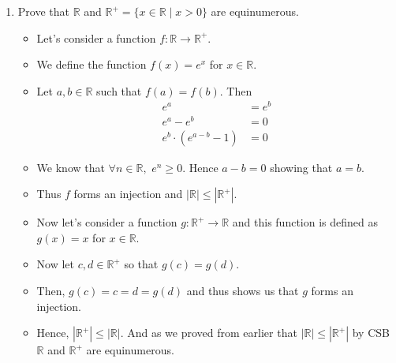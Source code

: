 \documentclass[letterpaper,12pt]{article}
\begin{document}
\begin{enumerate}
\item Prove that $\mathbb{R}$ and $\mathbb{R}^{+} = \{x \in \mathbb{R} \mid x>0\}$ are equinumerous.
\begin{itemize}
\item Let's consider a function $f:\mathbb{R} \rightarrow \mathbb{R}^{+}$.
\item We define the function $f(x) = e^x$ for $x\in \mathbb{R}$.
\item Let $a,b \in \mathbb{R}$ such that $f(a)=f(b).$ Then 
\begin{align}
e^a &= e^b \\ e^a-e^b &=0 \\ e^b \cdot (e^{a-b} -1) &=0	
\end{align}
\item We know that $\forall n\in \mathbb{R},$ $e^n \geq 0.$ Hence $a-b=0$ showing that $a=b$.
\item Thus $f $ forms an injection and $|\mathbb{R}| \leq  |\mathbb{R}^{+}|$.
\item Now let's consider a function $g: \mathbb{R}^{+} \rightarrow \mathbb{R}$ and this function is defined as $g(x) =x$ for $x\in \mathbb{R}.$
\item Now let $c,d \in \mathbb{R}^{+}$ so that $g(c) =g(d)$.
\item Then, $g(c)=c=d=g(d)$ and thus shows us that $g$ forms an injection. 
\item Hence, $|\mathbb{R}^{+} | \leq |\mathbb{R}|.$ And as we proved from earlier that $|\mathbb{R}| \leq |\mathbb{R}^{+}|$ by CSB $\mathbb{R}$ and $\mathbb{R}^{+}$ are equinumerous.
\end{itemize}


\end{enumerate}
\end{document}

